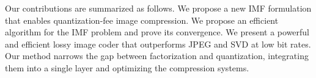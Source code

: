 Our contributions are summarized as follows. We propose a new IMF formulation that enables quantization-fee image compression. We propose an efficient algorithm for the IMF problem and prove its convergence. We present a powerful and efficient lossy image coder that outperforms JPEG and SVD at low bit rates. Our method narrows the gap between factorization and quantization, integrating them into a single layer and optimizing the compression systems.
